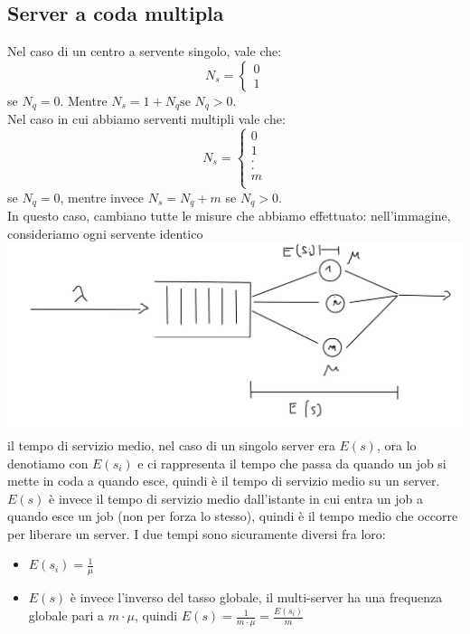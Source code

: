 \documentclass{article}
\begin{document}
\subsection{Server a coda multipla}
Nel caso di un centro a servente singolo, vale che:
\[
N_s =
\begin{cases}
0 \\
1
\end{cases}
\]
se $N_q = 0$. Mentre $N_s = 1 + N_q \text{se } N_q > 0$. \\ Nel caso in cui abbiamo serventi multipli vale che:
\[
N_s = 
\begin{cases}
0 \\
1 \\
. \\
. \\
m \\
\end{cases}
\]
se $N_q = 0$, mentre invece $N_s = N_q + m$ se $N_q > 0$.\\
In questo caso, cambiano tutte le misure che abbiamo effettuato:
nell'immagine, consideriamo ogni servente identico\\
\includegraphics[scale=0.3]{images/PMCSN-903.jpeg}\\
il tempo di servizio medio, nel caso di un singolo server era $E(s)$, ora lo denotiamo con $E(s_i)$ e ci rappresenta il tempo che passa da quando un job si mette in coda a quando esce, quindi è il tempo di servizio medio su un server.\\ $E(s)$ è invece il tempo di servizio medio dall'istante in cui entra un job a quando esce un job (non per forza lo stesso), quindi è il tempo medio che occorre per liberare un server. I due tempi sono sicuramente diversi fra loro:
\begin{itemize}
\item $E(s_i) = \frac{1}{\mu}$
\item $E(s)$ è invece l'inverso del tasso globale, il multi-server ha una frequenza globale pari a $m\cdot \mu$, quindi $E(s) = \frac{1}{m\cdot \mu} = \frac{E(s_i)}{m}$
\end{itemize}
\end{document}
